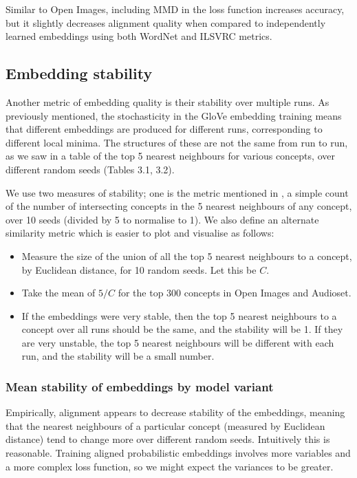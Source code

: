 Similar to Open Images, including MMD in the loss function increases accuracy, but it slightly decreases alignment quality when compared to independently learned embeddings using both WordNet and ILSVRC metrics. 

\subsection{Embedding stability}

Another metric of embedding quality is their stability over multiple runs. As previously mentioned, the stochasticity in the GloVe embedding training means that different embeddings are produced for different runs, corresponding to different local minima. The structures of these are not the same from run to run, as we saw in a table of the top 5 nearest neighbours for various concepts, over different random seeds (Tables 3.1, 3.2). %

We use two measures of stability; one is the metric mentioned in \cite{WordEmbeddingStability}, a simple count of the number of intersecting concepts in the 5 nearest neighbours of any concept, over 10 seeds (divided by 5 to normalise to 1). We also define an alternate similarity metric which is easier to plot and visualise as follows:

\begin{itemize}
    \item Measure the size of the union of all the top 5 nearest neighbours to a concept, by Euclidean distance, for 10 random seeds. Let this be $C$. 
    \item Take the mean of $5/C$ for the top 300 concepts in Open Images and Audioset.
    \item If the embeddings were very stable, then the top 5 nearest neighbours to a concept over all runs should be the same, and the stability will be 1. If they are very unstable, the top 5 nearest neighbours will be different with each run, and the stability will be a small number. 
\end{itemize}

\subsubsection{Mean stability of embeddings by model variant}

Empirically, alignment appears to decrease stability of the embeddings, meaning that the nearest neighbours of a particular concept (measured by Euclidean distance) tend to change more over different random seeds. Intuitively this is reasonable. Training aligned probabilistic embeddings involves more variables and a more complex loss function, so we might expect the variances to be greater. 

